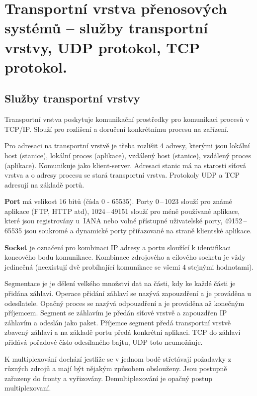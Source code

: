 \clearpage
\section{Transportní vrstva přenosových systémů -- služby transportní vrstvy, UDP protokol, TCP protokol.}

\subsection{Služby transportní vrstvy}

Transportní vrstva poskytuje komunikační prostředky pro komunikaci procesů v TCP/IP. Slouží pro rozlišení a doručení konkrétnímu procesu na zařízení.

Pro adresaci na transportní vrstvě je třeba rozlišit 4 adresy, kterými jsou lokální host (stanice), lokální proces (aplikace), vzdálený host (stanice), vzdálený proces (aplikace). Komunikuje jako klient-server. Adresaci stanic má na starosti síťová vrstva a o adresy procesu se stará transportní vrstva. Protokoly UDP a TCP adresují na základě portů.

\textbf{Port} má velikost 16 bitů (čísla 0 - 65535). Porty 0\,--\,1023 slouží pro známé aplikace (FTP, HTTP atd), 1024\,--\,49151 slouží pro méně používané aplikace, které jsou registrovány u~IANA nebo volné přístupné uživatelské porty, 49152\,--\,65535 jsou soukromé a dynamické porty přiřazované na straně klientské aplikace.

\textbf{Socket} je označení pro kombinaci IP adresy a portu sloužící k identifikaci koncového bodu komunikace. Kombinace zdrojového a cílového socketu je vždy jedinečná (neexistují dvě probíhající komunikace se všemi 4 stejnými hodnotami). 

Segmentace je je dělení velkého množství dat na části, kdy ke každé části je přidána záhlaví. Operace přidání záhlaví se nazývá zapouzdření a je prováděna u odesílatele. Opačný proces se nazývá odpouzdření a je prováděna až konečným příjemcem. Segment se záhlavím je předán síťové vrstvě a zapouzdřen IP záhlavím a odeslán jako paket. Příjemce segment předá transportní vrstvě zbavený záhlaví a na základě portu předá konkrétní aplikaci. TCP do záhlaví přidává pořadové číslo odesílaného bajtu, UDP toto neumožňuje. 

K multiplexování dochází jestliže se v jednom bodě střetávají požadavky z různých zdrojů a mají být nějakým způsobem obslouženy. Jsou postupně zařazeny do fronty a vyřizovány. Demultiplexování je opačný postup multiplexovaní. 

